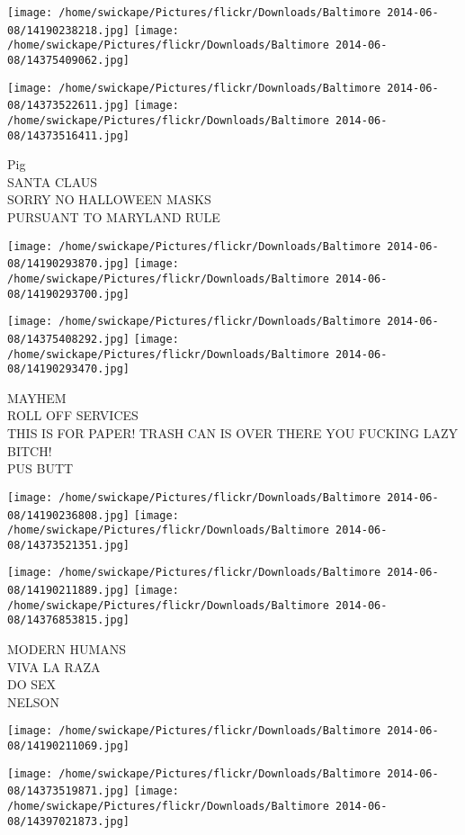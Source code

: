 \documentclass[10pt,letterpaper]{article}
\begin{document}
\texttt{[image: /home/swickape/Pictures/flickr/Downloads/Baltimore 2014-06-08/14190238218.jpg]}
\texttt{[image: /home/swickape/Pictures/flickr/Downloads/Baltimore 2014-06-08/14375409062.jpg]}

\texttt{[image: /home/swickape/Pictures/flickr/Downloads/Baltimore 2014-06-08/14373522611.jpg]}
\texttt{[image: /home/swickape/Pictures/flickr/Downloads/Baltimore 2014-06-08/14373516411.jpg]}

Pig\\
SANTA CLAUS\\
SORRY NO HALLOWEEN MASKS\\
PURSUANT TO MARYLAND RULE
\pagebreak

\texttt{[image: /home/swickape/Pictures/flickr/Downloads/Baltimore 2014-06-08/14190293870.jpg]}
\texttt{[image: /home/swickape/Pictures/flickr/Downloads/Baltimore 2014-06-08/14190293700.jpg]}

\texttt{[image: /home/swickape/Pictures/flickr/Downloads/Baltimore 2014-06-08/14375408292.jpg]}
\texttt{[image: /home/swickape/Pictures/flickr/Downloads/Baltimore 2014-06-08/14190293470.jpg]}

MAYHEM\\
ROLL OFF SERVICES\\
THIS IS FOR PAPER!  TRASH CAN IS OVER THERE YOU FUCKING LAZY BITCH!\\
PUS BUTT
\pagebreak

\texttt{[image: /home/swickape/Pictures/flickr/Downloads/Baltimore 2014-06-08/14190236808.jpg]}
\texttt{[image: /home/swickape/Pictures/flickr/Downloads/Baltimore 2014-06-08/14373521351.jpg]}

\texttt{[image: /home/swickape/Pictures/flickr/Downloads/Baltimore 2014-06-08/14190211889.jpg]}
\texttt{[image: /home/swickape/Pictures/flickr/Downloads/Baltimore 2014-06-08/14376853815.jpg]}

MODERN HUMANS\\
VIVA LA RAZA\\
DO SEX\\
NELSON
\pagebreak

\texttt{[image: /home/swickape/Pictures/flickr/Downloads/Baltimore 2014-06-08/14190211069.jpg]}

\vspace{0.25in}
\texttt{[image: /home/swickape/Pictures/flickr/Downloads/Baltimore 2014-06-08/14373519871.jpg]}
\texttt{[image: /home/swickape/Pictures/flickr/Downloads/Baltimore 2014-06-08/14397021873.jpg]}
\end{document}
